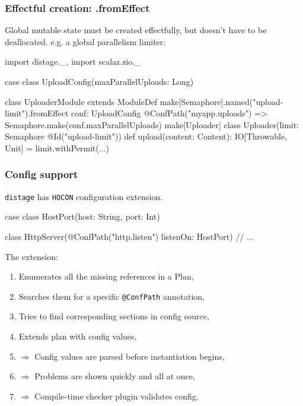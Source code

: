 \documentclass[usenames,dvipsnames]{beamer}
\newcommand{\distage}{\texttt{distage}\xspace}
\begin{document}
\begin{frame}[fragile]
\frametitle{Effectful creation: .fromEffect}
  Global mutable state must be created effectfully, but doesn't have to be deallocated. e.g. a global parallelism limiter:

  \begin{scalacode}
    import distage._, import scalaz.zio._

    case class UploadConfig(maxParallelUploads: Long)

    class UploaderModule extends ModuleDef {
      make[Semaphore].named("upload-limit").fromEffect {
        conf: UploadConfig @ConfPath("myapp.uploads") =>
          Semaphore.make(conf.maxParallelUploads) }
      make[Uploader]
    }
    class Uploader(limit: Semaphore @Id("upload-limit")) {
      def upload(content: Content): IO[Throwable, Unit] =
        limit.withPermit(...)
    }
  \end{scalacode}
\end{frame}

\begin{frame}[fragile]
\frametitle{Config support}
  \distage has \texttt{HOCON} configuration extension.

  \begin{scalacode}
case class HostPort(host: String, port: Int)

class HttpServer(@ConfPath("http.listen") listenOn: HostPort) {
  // ...
}
  \end{scalacode}

  The extension:
  \begin{enumerate}
  \item Enumerates all the missing references in a Plan,
  \item Searches them for a specific \texttt{@ConfPath} annotation,
  \item Tries to find corresponding sections in config source,
  \item Extends plan with config values,
  \item $\Rightarrow$ Config values are parsed before instantiation begins,
  \item $\Rightarrow$ Problems are shown quickly and all at once,
  \item $\Rightarrow$ Compile-time checker plugin validates config.
  \end{enumerate}
\end{frame}
\end{document}
